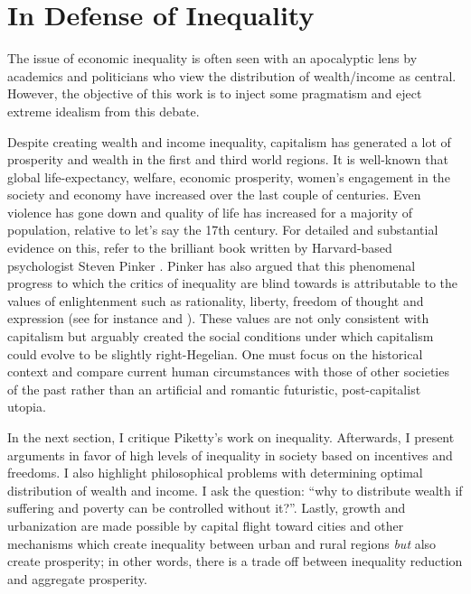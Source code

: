 \documentclass[12pt]{article}
\newcommand{\1}{\mathbbm 1}
\begin{document}
		
		

			
		
		
		\section{In Defense of Inequality}
		
		
		The issue of economic inequality is often seen with an apocalyptic lens by academics and politicians who view the distribution of wealth/income as central. However, the objective of this work is to inject some pragmatism and eject extreme idealism from this debate.
		
		Despite creating wealth and income inequality, capitalism has generated a lot of prosperity and wealth in the first and third world regions. It is well-known that global life-expectancy, welfare, economic prosperity, women's engagement in the society and economy have increased over the last couple of centuries. Even violence has gone down and quality of life has increased for a majority of population, relative to let's say the 17th century. For detailed and substantial evidence on this, refer to the brilliant book written by Harvard-based psychologist Steven Pinker \cite{pinker2011better}. Pinker has also argued that this phenomenal progress to which the critics of inequality are blind towards is attributable to the values of enlightenment such as rationality, liberty, freedom of thought and expression (see for instance \cite{pinker2018enlightenment} and \cite{pinker2022rationality}). These values are not only consistent with capitalism but arguably created the social conditions under which capitalism could evolve to be slightly right-Hegelian. One must focus on the historical context and compare current human circumstances with those of other societies of the past rather than an artificial and romantic futuristic, post-capitalist utopia. 
		
	    In the next section, I critique Piketty's work on inequality. Afterwards, I present arguments in favor of high levels of inequality in society based on incentives and freedoms. I also highlight philosophical problems with determining optimal distribution of wealth and income. I ask the question: ``why to distribute wealth if suffering and poverty can be controlled without it?''. Lastly, growth and urbanization are made possible by capital flight toward cities and other mechanisms which create inequality between urban and rural regions \textit{but} also create prosperity; in other words, there is a trade off between inequality reduction and aggregate prosperity.
	
\end{document}

